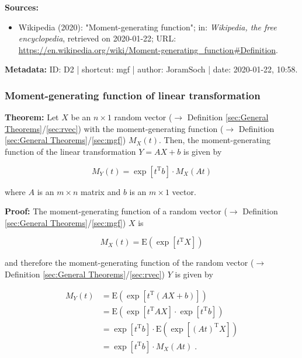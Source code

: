 \documentclass[a4paper,12pt,twoside]{book}
\begin{document}
\vspace{1em}
\textbf{Sources:}
\begin{itemize}
\item Wikipedia (2020): "Moment-generating function"; in: \textit{Wikipedia, the free encyclopedia}, retrieved on 2020-01-22; URL: \url{https://en.wikipedia.org/wiki/Moment-generating_function#Definition}.
\end{itemize}


\vspace{1em}
\textbf{Metadata:} ID: D2 | shortcut: mgf | author: JoramSoch | date: 2020-01-22, 10:58.
\vspace{1em}



\subsubsection[\textbf{Moment-generating function of linear transformation}]{Moment-generating function of linear transformation} \label{sec:mgf-ltt}
\setcounter{equation}{0}

\textbf{Theorem:} Let $X$ be an $n \times 1$ random vector ($\rightarrow$ Definition \ref{sec:General Theorems}/\ref{sec:rvec}) with the moment-generating function ($\rightarrow$ Definition \ref{sec:General Theorems}/\ref{sec:mgf}) $M_X(t)$. Then, the moment-generating function of the linear transformation $Y = A X + b$ is given by

\begin{equation} \label{eq:mgf-ltt-mgf-ltt}
M_Y(t) = \exp \left[ t^\mathrm{T} b \right] \cdot M_X(At)
\end{equation}

where $A$ is an $m \times n$ matrix and $b$ is an $m \times 1$ vector.


\vspace{1em}
\textbf{Proof:} The moment-generating function of a random vector ($\rightarrow$ Definition \ref{sec:General Theorems}/\ref{sec:mgf}) $X$ is

\begin{equation} \label{eq:mgf-ltt-mfg-vect}
M_X(t) = \mathrm{E} \left( \exp \left[ t^\mathrm{T} X \right] \right)
\end{equation}

and therefore the moment-generating function of the random vector ($\rightarrow$ Definition \ref{sec:General Theorems}/\ref{sec:rvec}) $Y$ is given by

\begin{equation} \label{eq:mgf-ltt-mgf-ltt-qed}
\begin{split}
M_Y(t) &= \mathrm{E} \left( \exp \left[ t^\mathrm{T} (AX + b) \right] \right) \\
&= \mathrm{E} \left( \exp \left[ t^\mathrm{T} A X \right] \cdot \exp \left[ t^\mathrm{T} b \right] \right) \\
&= \exp \left[ t^\mathrm{T} b \right] \cdot \mathrm{E} \left( \exp \left[ (A t)^\mathrm{T} X \right] \right) \\
&= \exp \left[ t^\mathrm{T} b \right] \cdot M_X(At) \; .
\end{split}
\end{equation}
\end{document}
